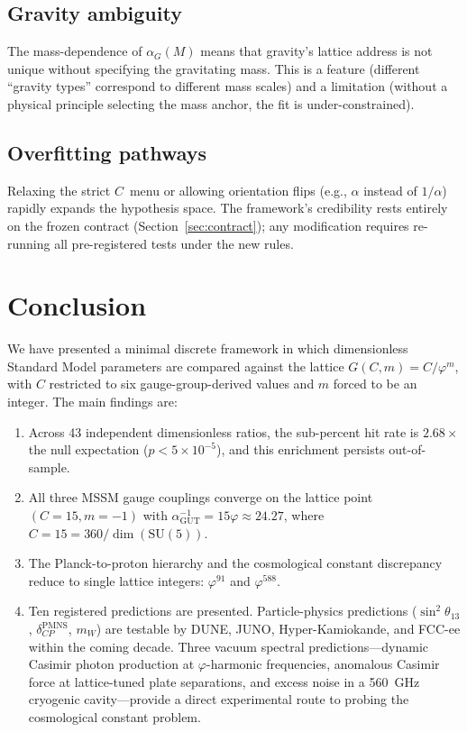 \documentclass[12pt,a4paper]{article}
\newcommand{\vp}{\varphi}
\newcommand{\aGUT}{\alpha_{\mathrm{GUT}}}
\begin{document}
\subsection{Gravity ambiguity}
\label{sec:gravity_ambiguity}

The mass-dependence of $\alpha_G(M)$ means that gravity's lattice address is
not unique without specifying the gravitating mass.  This is a feature
(different ``gravity types'' correspond to different mass scales) and a
limitation (without a physical principle selecting the mass anchor, the fit
is under-constrained).

\subsection{Overfitting pathways}
\label{sec:overfitting}

Relaxing the strict $C$~menu or allowing orientation flips (e.g., $\alpha$
instead of $1/\alpha$) rapidly expands the hypothesis space.  The framework's
credibility rests entirely on the frozen contract
(Section~\ref{sec:contract}); any modification requires re-running all
pre-registered tests under the new rules.


\section{Conclusion}
\label{sec:conclusion}

We have presented a minimal discrete framework in which dimensionless Standard
Model parameters are compared against the lattice $G(C,m) = C/\vp^m$, with
$C$ restricted to six gauge-group-derived values and $m$ forced to be an
integer.  The main findings are:

\begin{enumerate}[nosep]
  \item Across 43 independent dimensionless ratios, the sub-percent hit rate
    is $2.68\times$ the null expectation ($p < 5\times 10^{-5}$), and this
    enrichment persists out-of-sample.
  \item All three MSSM gauge couplings converge on the lattice point
    $(C=15, m=-1)$ with $\aGUT^{-1} = 15\vp \approx 24.27$, where
    $C = 15 = 360/\dim(\mathrm{SU}(5))$.
  \item The Planck-to-proton hierarchy and the cosmological constant
    discrepancy reduce to single lattice integers: $\vp^{91}$ and $\vp^{588}$.
  \item Ten registered predictions are presented.  Particle-physics
    predictions ($\sin^2\theta_{13}$, $\delta_{CP}^{\mathrm{PMNS}}$, $m_W$)
    are testable by DUNE, JUNO, Hyper-Kamiokande, and FCC-ee within the
    coming decade.  Three vacuum spectral predictions---dynamic Casimir
    photon production at $\vp$-harmonic frequencies, anomalous Casimir force
    at lattice-tuned plate separations, and excess noise in a 560~GHz
    cryogenic cavity---provide a direct experimental route to probing the
    cosmological constant problem.
\end{enumerate}
\end{document}
